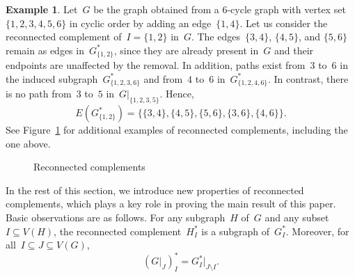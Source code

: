 \documentclass[10pt]{amsart}
\theoremstyle{plain}
\numberwithin{equation}{section}
\theoremstyle{definition}
\newtheorem{example}[theorem]{Example}
\begin{document}
\begin{example}
    Let~$G$ be the graph obtained from a $6$-cycle graph with vertex set $\{1, 2, 3, 4, 5, 6\}$ in cyclic order by adding an edge~$\{1,4\}$.
    Let us consider the reconnected complement of~$I = \{1,2\}$ in~$G$.  
The edges~$\{3,4\}$, $\{4,5\}$, and $\{5,6\}$ remain as edges in~$G^\ast_{\{1,2\}}$, since they are already present in~$G$ and their endpoints are unaffected by the removal.  
In addition, paths exist from~$3$ to~$6$ in the induced subgraph~$G^\ast_{\{1,2,3,6\}}$ and from~$4$ to~$6$ in~$G^\ast_{\{1,2, 4,6\}}$.  
In contrast, there is no path from~$3$ to~$5$ in~$G|_{\{1,2, 3,5\}}$.  
Hence,  
$$
E(G^\ast_{\{1,2\}}) = \big\{\{3,4\}, \{4,5\}, \{5,6\}, \{3,6\}, \{4,6\}\big\}.
$$  
See Figure~\ref{figure:rec} for additional examples of reconnected complements, including the one above.
\begin{figure}
\centering
{}
  \caption{Reconnected complements}\label{figure:rec}
\end{figure}
\end{example}

In the rest of this section, we introduce new properties of reconnected complements, which plays a key role in proving the main result of this paper.
Basic observations are as follows. For any subgraph~$H$ of~$G$ and any subset~$I \subseteq V(H)$, the reconnected complement~$H^\ast_{I}$ is a subgraph of~$G^\ast_{I}$.
Moreover, for all~$I \subseteq J \subseteq V(G)$,
\begin{equation}\label{eq:inter}
  (G\vert_{J})^\ast_{I} = G^\ast_{I}\vert_{J \setminus I}.
\end{equation}
\end{document}
